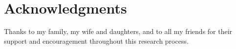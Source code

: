 \chapter*{Acknowledgments}
Thanks to my family, my wife and daughters, 
and to all my friends
for their support and encouragement throughout
this research process.
